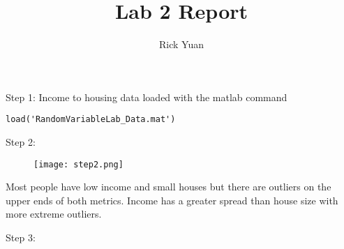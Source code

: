 \documentclass[11pt]{article}
\title{Lab 2 Report}
\author{Rick Yuan}
\begin{document}
\maketitle

Step 1: 
Income to housing data loaded with the matlab command

\begin{lstlisting}
load('RandomVariableLab_Data.mat')
\end{lstlisting}

Step 2:

\begin{figure}[H]
            \centering
            \texttt{[image: step2.png]}
\end{figure}

Most people have low income and small houses but there are outliers on the upper ends of both metrics.
Income has a greater spread than house size with more extreme outliers.

Step 3:
\end{document}
